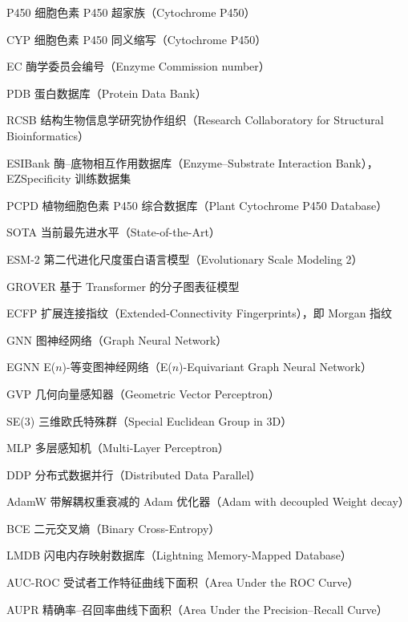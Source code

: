
\begin{notation}

  \begin{notationlist}{6em}
    \item[P450] 细胞色素 P450 超家族（Cytochrome P450）
    \item[CYP] 细胞色素 P450 同义缩写（Cytochrome P450）
    \item[EC] 酶学委员会编号（Enzyme Commission number）
    \item[PDB] 蛋白数据库（Protein Data Bank）
    \item[RCSB] 结构生物信息学研究协作组织（Research Collaboratory for Structural Bioinformatics）
    \item[ESIBank] 酶--底物相互作用数据库（Enzyme--Substrate Interaction Bank），EZSpecificity 训练数据集
    \item[PCPD] 植物细胞色素 P450 综合数据库（Plant Cytochrome P450 Database）
    \item[SOTA] 当前最先进水平（State-of-the-Art）
    \item[ESM-2] 第二代进化尺度蛋白语言模型（Evolutionary Scale Modeling 2）
    \item[GROVER] 基于 Transformer 的分子图表征模型
    \item[ECFP] 扩展连接指纹（Extended-Connectivity Fingerprints），即 Morgan 指纹
    \item[GNN] 图神经网络（Graph Neural Network）
    \item[EGNN] E($n$)-等变图神经网络（E($n$)-Equivariant Graph Neural Network）
    \item[GVP] 几何向量感知器（Geometric Vector Perceptron）
    \item[SE(3)] 三维欧氏特殊群（Special Euclidean Group in 3D）
    \item[MLP] 多层感知机（Multi-Layer Perceptron）
    \item[DDP] 分布式数据并行（Distributed Data Parallel）
    \item[AdamW] 带解耦权重衰减的 Adam 优化器（Adam with decoupled Weight decay）
    \item[BCE] 二元交叉熵（Binary Cross-Entropy）
    \item[LMDB] 闪电内存映射数据库（Lightning Memory-Mapped Database）
    \item[AUC-ROC] 受试者工作特征曲线下面积（Area Under the ROC Curve）
    \item[AUPR] 精确率--召回率曲线下面积（Area Under the Precision--Recall Curve）

\end{notationlist}
\end{notation}
